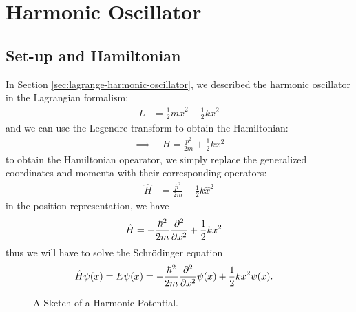 \section{Harmonic Oscillator}
\subsection{Set-up and Hamiltonian}
In Section \ref{sec:lagrange-harmonic-oscillator}, we described the harmonic oscillator in the Lagrangian formalism:
\begin{align}
  L & = \frac{1}{2} m \dot{x}^2 - \frac{1}{2} k x^2
\end{align}
and we can use the Legendre transform to obtain the Hamiltonian:
\begin{align}
  \implies \quad H = \frac{p^2}{2m} + \frac{1}{2} k x^2
\end{align}
to obtain the Hamiltonian opearator, we simply replace the generalized coordinates and momenta with their corresponding operators:
\begin{align}
  \hat{H} & = \frac{\hat{p}^2}{2m} + \frac{1}{2} k \hat{x}^2
\end{align}
in the position representation, we have
\begin{align}
  \hat{H} & = -\frac{\hbar^2}{2m} \pdv[2]{}{x} + \frac{1}{2} k x^2
\end{align}
thus we will have to solve the Schrödinger equation
\begin{align}
  \hat{H} \psi(x) & = E \psi(x) = -\frac{\hbar^2}{2m} \pdv[2]{}{x} \psi(x) + \frac{1}{2} k x^2 \psi(x).
\end{align}

\begin{figure}[htbp]
  \centering
  \caption{A Sketch of a Harmonic Potential.}
  \label{fig:ho_potential}
\end{figure}

